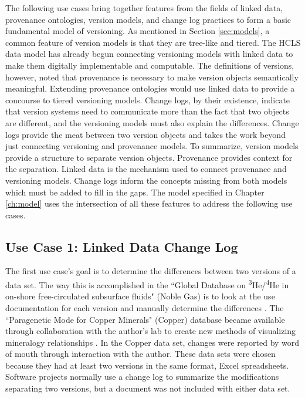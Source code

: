 The following use cases bring together features from the fields of linked data, provenance ontologies, version models, and change log practices to form a basic fundamental model of versioning.
As mentioned in Section \ref{sec:models}, a common feature of version models is that they are tree-like and tiered.
The HCLS data model has already begun connecting versioning models with linked data to make them digitally implementable and computable.
The definitions of versions, however, noted that provenance is necessary to make version objects semantically meaningful.
Extending provenance ontologies would use linked data to provide a concourse to tiered versioning models.
Change logs, by their existence, indicate that version systems need to communicate more than the fact that two objects are different, and the versioning models must also explain the differences.
Change logs provide the meat between two version objects and takes the work beyond just connecting versioning and provenance models.
To summarize, version models provide a structure to separate version objects.
Provenance provides context for the separation.
Linked data is the mechanism used to connect provenance and versioning models.
Change logs inform the concepts missing from both models which must be added to fill in the gaps.
The model specified in Chapter \ref{ch:model} uses the intersection of all these features to address the following use cases.

\subsection{Use Case 1: Linked Data Change Log}

The first use case's goal is to determine the differences between two versions of a data set.
The way this is accomplished in the ``Global Database on \textsuperscript{3}He/\textsuperscript{4}He in on-shore free-circulated subsurface fluids" (Noble Gas) is to look at the use documentation for each version and manually determine the differences \cite{Polyak2015}.
The ``Paragenetic Mode for Copper Minerals" (Copper) database became available through collaboration with the author's lab to create new methods of visualizing mineralogy relationships \cite{Morrison2016}.
In the Copper data set, changes were reported by word of mouth through interaction with the author.
These data sets were chosen because they had at least two versions in the same format, Excel spreadsheets.
Software projects normally use a change log to summarize the modifications separating two versions, but a document was not included with either data set.

